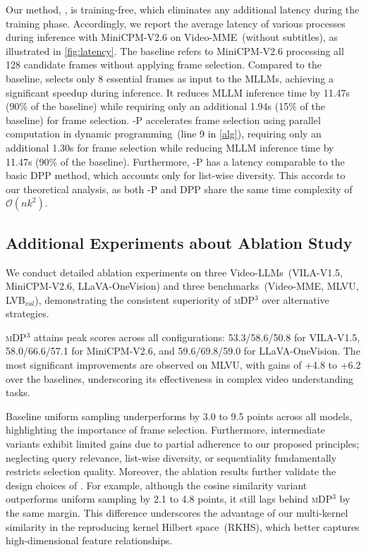 Our method, \mname{}, is training-free, which eliminates any additional latency during the training phase.
Accordingly, we report the average latency of various processes during inference with MiniCPM-V2.6 on Video-MME~(without subtitles), as illustrated in \cref{fig:latency}.
The baseline refers to MiniCPM-V2.6 processing all 128 candidate frames without applying frame selection.
%
Compared to the baseline, \mname{} selects only 8 essential frames as input to the MLLMs, achieving a significant speedup during inference.  
It reduces MLLM inference time by 11.47s (90\% of the baseline) while requiring only an additional 1.94s (15\% of the baseline) for frame selection.
%
\mname{}-P accelerates frame selection using parallel computation in dynamic programming~(\ie line 9 in \cref{alg}), requiring only an additional 1.30s for frame selection while reducing MLLM inference time by 11.47s (90\% of the baseline).
%
Furthermore, \mname{}-P has a latency comparable to the basic DPP method, which accounts only for list-wise diversity.  
This accords to our theoretical analysis, as both \mname{}-P and DPP share the same time complexity of $\mathcal{O}(nk^2)$.


\subsection{Additional Experiments about Ablation Study}

We conduct detailed ablation experiments on three Video-LLMs~(VILA-V1.5, MiniCPM-V2.6, LLaVA-OneVision) and three benchmarks~(Video-MME, MLVU, LVB$_{val}$), demonstrating the consistent superiority of \textsc{mDP}$^3$ over alternative strategies. 

\textsc{mDP}$^3$ attains peak scores across all configurations: 53.3/58.6/50.8 for VILA-V1.5, 58.0/66.6/57.1 for MiniCPM-V2.6, and 59.6/69.8/59.0 for LLaVA-OneVision.
The most significant improvements are observed on MLVU, with gains of +4.8 to +6.2 over the baselines, underscoring its effectiveness in complex video understanding tasks.

Baseline uniform sampling underperforms by 3.0 to 9.5 points across all models, highlighting the importance of frame selection.
Furthermore, intermediate variants exhibit limited gains due to partial adherence to our proposed principles; neglecting query relevance, list-wise diversity, or sequentiality fundamentally restricts selection quality. 
%
Moreover, the ablation results further validate the design choices of \mname{}. For example, although the cosine similarity variant outperforms uniform sampling by 2.1 to 4.8 points, it still lags behind \textsc{mDP}$^3$ by the same margin. This difference underscores the advantage of our multi-kernel similarity in the reproducing kernel Hilbert space~(RKHS), which better captures high-dimensional feature relationships.


